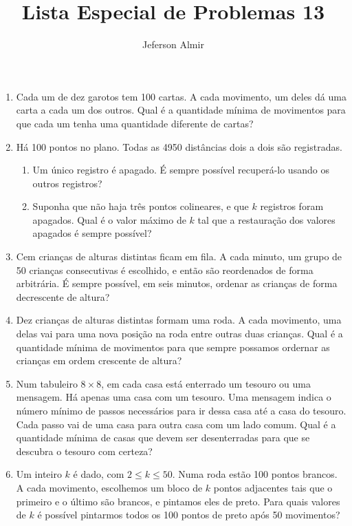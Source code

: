 \documentclass{article}
\title{Lista Especial de Problemas 13}
\author{Jeferson Almir}
\date{}
\begin{document}
\maketitle

\begin{enumerate}
    \item Cada um de dez garotos tem 100 cartas.
    A cada movimento, um deles dá uma carta a cada um dos outros.
    Qual é a quantidade mínima de movimentos para que cada um tenha uma quantidade diferente de cartas?
    
    \item Há 100 pontos no plano.
    Todas as 4950 distâncias dois a dois são registradas.
    
    \begin{enumerate}
    \item Um único registro é apagado.
    É sempre possível recuperá-lo usando os outros registros?
    
    \item Suponha que não haja três pontos colineares,
    e que $k$ registros foram apagados.
    Qual é o valor máximo de $k$ tal que a restauração dos valores apagados é sempre possível?
    \end{enumerate}
    
    \item Cem crianças de alturas distintas ficam em fila.
    A cada minuto, um grupo de 50 crianças consecutivas é escolhido,
    e então são reordenados de forma arbitrária.
    É sempre possível, em seis minutos,
    ordenar as crianças de forma decrescente de altura?
    
    \item Dez crianças de alturas distintas formam uma roda.
    A cada movimento, uma delas vai para uma nova posição na roda
    entre outras duas crianças.
    Qual é a quantidade mínima de movimentos para que sempre possamos
    ordernar as crianças em ordem crescente de altura?
    
    \item Num tabuleiro $8\times 8$, em cada casa está enterrado um tesouro ou uma mensagem.
    Há apenas uma casa com um tesouro.
    Uma mensagem indica o número mínimo de passos necessários para ir
    dessa casa até a casa do tesouro.
    Cada passo vai de uma casa para outra casa com um lado comum.
    Qual é a quantidade mínima de casas que devem ser desenterradas
    para que se descubra o tesouro com certeza?
    
    \item Um inteiro $k$ é dado, com $2\leq k\leq50$.
    Numa roda estão 100 pontos brancos.
    A cada movimento, escolhemos um bloco de $k$ pontos adjacentes
    tais que o primeiro e o último são brancos,
    e pintamos eles de preto.
    Para quais valores de $k$ é possível pintarmos todos os 100 pontos de preto após 50 movimentos?
    

\end{enumerate}
\end{document}

